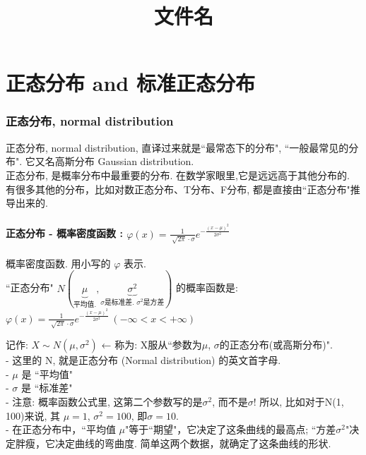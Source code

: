 \documentclass[UTF8]{ctexart}
\title{文件名}
\begin{document}
	\tableofcontents %
	\date{} %
	\maketitle  %

	\part{正态分布 and 标准正态分布}
	
	\section{正态分布, normal distribution}
	
	正态分布, normal distribution, 直译过来就是``最常态下的分布", ``一般最常见的分布". 它又名高斯分布 Gaussian distribution.  \\
	正态分布, 是概率分布中最重要的分布. 在数学家眼里,它是远远高于其他分布的. 有很多其他的分布，比如对数正态分布、T分布、F分布, 都是直接由``正态分布"推导出来的. \\
	
	
	
	
	
	
	
	
	
	
	

\subsection{正态分布 - 概率密度函数 : $\boxed{
	\varphi (x)=\frac{1}{\sqrt[]{2\pi}\cdot \sigma}e^{-\frac{(x-\mu )^2}{2\sigma ^2}}
}$ }
	
	概率密度函数. 用小写的 $\varphi$ 表示. \\
	``正态分布" $N(\underset{\text{平均值}.}{\underbrace{\mu }},\underset{\sigma \text{是标准差.\ }\sigma ^2\text{是方差}}{\underbrace{\sigma ^2}})	$ 的概率函数是: 
	 $\boxed{
		\varphi (x)=\frac{1}{\sqrt[]{2\pi}\cdot \sigma}e^{-\frac{(x-\mu )^2}{2\sigma ^2}} \ (-\infty <x<+\infty )
	}$  \\
\vspace{1em} 

	记作: $\boxed{X \sim N(\mu ,\sigma ^2)}$   ← 称为: X服从``参数为$\mu$, $\sigma$的正态分布(或高斯分布)". \\	
	- 这里的 N, 就是正态分布 (Normal distribution) 的英文首字母.\\
	- $\mu$ 是 ``平均值" \\
	- $\sigma$ 是 ``标准差" \\
	- 注意: 概率函数公式里, 这第二个参数写的是$\sigma ^2$, 而不是$\sigma$! 所以, 比如对于N(1, 100)来说, 其 $\mu=1$,  $\sigma ^2=100$, 即$\sigma=10$. \\
	- 在正态分布中，``平均值 $\mu$"等于``期望"，它决定了这条曲线的最高点; ``方差$\sigma^2$"决定胖瘦，它决定曲线的弯曲度. 简单这两个数据，就确定了这条曲线的形状. \\
	
\end{document}
